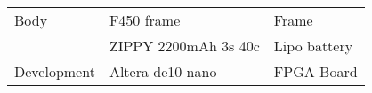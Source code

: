 \begin{table}[H]
\begin{tabular}{lll}
\rowcolor[HTML]{FFFFC7} 
Body                                                   & F450 frame                                             & Frame                                                                                                                \\
\rowcolor[HTML]{FFFFC7} 
                                                       & ZIPPY 2200mAh 3s 40c                                   & Lipo battery                                                                                                         \\
\rowcolor[HTML]{CBCEFB} 
Development                                            & Altera de10-nano                                       & FPGA Board                                                                                                          
\end{tabular}
\end{table}